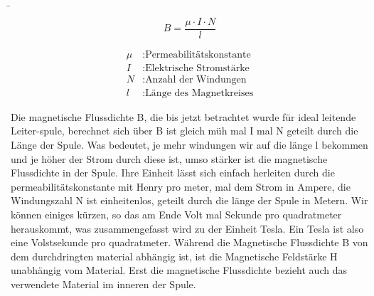 \begin{frame}[t]
	\b{
		\begin{equation*}
			B = \frac{\mu \cdot I \cdot N} {l}
		\end{equation*}

		\begin{align*}
			\mu & : \text{Permeabilitätskonstante} \\
			I   & : \text{Elektrische Stromstärke} \\
			N   & : \text{Anzahl der Windungen}    \\
			l   & : \text{Länge des Magnetkreises}
		\end{align*}
}
	{Die magnetische Flussdichte B, die bis jetzt betrachtet wurde für ideal leitende Leiter-spule, berechnet sich über B ist gleich müh mal I mal N geteilt durch die Länge der Spule.
	Was bedeutet, je mehr windungen wir auf die länge l bekommen und je höher der Strom durch diese  ist, umso stärker ist die magnetische Flussdichte in der Spule.}
	{Ihre Einheit lässt sich einfach herleiten durch die permeabilitätskonstante mit Henry pro meter, mal dem Strom in Ampere, die Windungszahl N ist einheitenlos, geteilt durch die länge der Spule in Metern.
	Wir können einiges kürzen, so das am Ende Volt mal Sekunde pro quadratmeter herauskommt, was zusammengefasst wird zu der Einheit Tesla.
	Ein Tesla ist also eine Volstsekunde pro quadratmeter.
	}
	{Während die Magnetische Flussdichte B von dem durchdringten material abhängig ist, ist die Magnetische Feldstärke H unabhängig vom Material. Erst die magnetische Flussdichte bezieht auch das verwendete Material im inneren der Spule.}
\end{frame}
